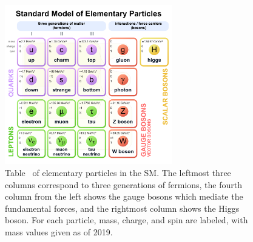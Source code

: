 \begin{figure}[tb]
	\begin{center}
	\includegraphics[width=0.65\textwidth]{fig/theory/Standard_Model_of_Elementary_Particles.png}
		\caption[Table of elementary particles in the SM. The leftmost three columns correspond to three generations of fermions, 
		the fourth column from the left shows the gauge bosons which mediate the elementary forces, and the rightmost column shows the Higgs boson. 
		For each particle, mass, charge, and spin are labeled, with mass values given as of 2019.]
		{Table~\cite{SMImage} of elementary particles in the SM. The leftmost three columns correspond to three generations of fermions, 
		the fourth column from the left shows the gauge bosons which mediate the fundamental forces, and the rightmost column shows the Higgs boson. 
		For each particle, mass, charge, and spin are labeled, with mass values given as of 2019.}
		\label{fig:SMParticles}
	\end{center}
\end{figure}

